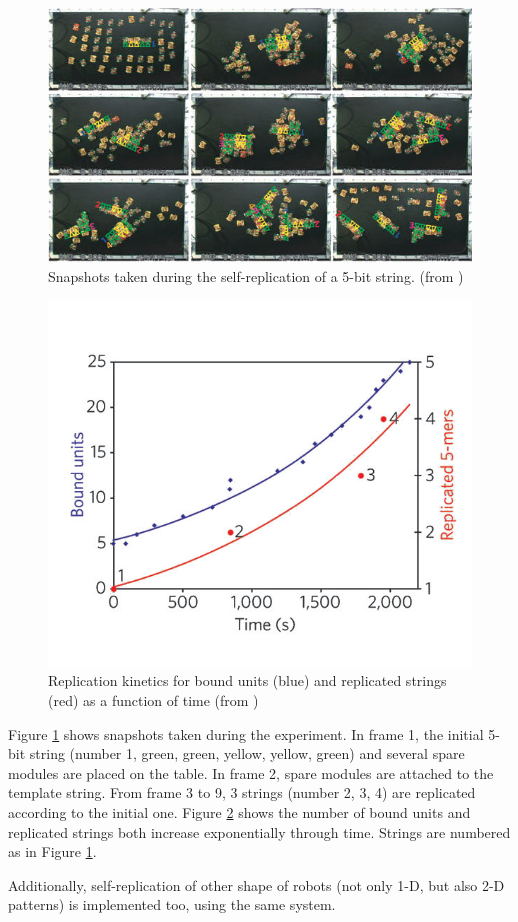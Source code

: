 \documentclass[12pt,twoside]{article}
\theoremstyle{plain}
\theoremstyle{definition}
\theoremstyle{remark}
\begin{document}
\begin{figure}[t]
	 \centerline{\includegraphics[width=1\textwidth]{griffith-1}}
	 {\caption{ Snapshots taken during the self-replication of a 5-bit string. (from \cite{griffith_self-replication_2005})}
	 \label{fig:gri-proc}}
\end{figure}

\begin{figure}[t]
	 \centerline{\includegraphics[width=.4\textwidth]{griffith}}
	 {\caption{ Replication kinetics for bound units (blue) and replicated strings (red) as a function of time (from \cite{griffith_self-replication_2005})}
	 \label{fig:gri-expo}}
\end{figure}

Figure \ref{fig:gri-proc} shows snapshots taken during the experiment. In frame 1, the initial 5-bit string (number 1, green, green, yellow, yellow, green) and several spare modules are placed on the table. In frame 2, spare modules are attached to the template string. From frame 3 to 9, 3 strings (number 2, 3, 4) are replicated according to the initial one. Figure \ref{fig:gri-expo} shows the number of bound units and replicated strings both increase exponentially through time. Strings are numbered as in Figure \ref{fig:gri-proc}.

Additionally, self-replication of other shape of robots (not only 1-D, but also 2-D patterns) is implemented too, using the same system.
\end{document}
